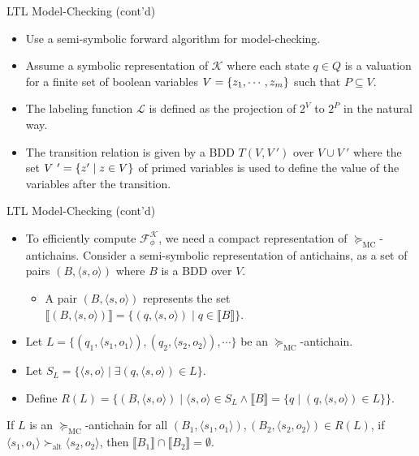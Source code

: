 \documentclass[12pt]{beamer}
\begin{document}
\begin{frame}{LTL Model-Checking (cont'd)}
	\begin{itemize}
		\item Use a semi-symbolic forward algorithm for model-checking.
		\item Assume
		a symbolic representation of $\mathcal{K}$ where each state $q \in Q$ is a valuation for a finite set
		of boolean variables $V = \{\mathnormal{z}_{1}, \cdots , \mathnormal{z}_{\mathnormal{m}}\}$ such that $P \subseteq V$.
		\item The labeling function $\mathcal{L}$ is defined as the projection of $2^{V}$ to $2^{P}$ in the natural way.
		\item The transition relation is given
		by a BDD $T(V, V~')$ over $V \cup V~'$ where the set $V~' = \{\mathnormal{z}' \mid \mathnormal{z} \in V\}$ of primed variables
		is used to define the value of the variables after the transition.
	\end{itemize}
\end{frame}

\begin{frame}{LTL Model-Checking (cont'd)}
	\begin{itemize}
		\item To efficiently compute $\mathcal{F}_{\phi}^{\mathcal{K}}$, we need a compact representation of $\succeq_{\text{MC}}$-antichains. Consider a semi-symbolic representation of antichains, as a set of pairs $(B, \langle s, o \rangle)$ where $B$ is a BDD over $V$.
		\begin{itemize}
			\item A pair $(B, \langle s, o \rangle)$ represents the set $\llbracket (B, \langle s, o \rangle) \rrbracket = \{(q, \langle s, o \rangle) \mid q \in \llbracket B \rrbracket\}$.
		\end{itemize}
		\item Let $L = \{(q_{1}, \langle s_{1},  o_{1} \rangle), (q_{2}, \langle s_{2}, o_{2} \rangle), \cdots \}$ be an $\succeq_{\text{MC}}$-antichain.
		\item Let $S_{L} = \{\langle s, o \rangle \mid \exists (q, \langle s, o \rangle) \in L\}$.
		\item Define $R(L) = \{(B, \langle s, o \rangle) \mid \langle s, o \rangle \in S_{L} \land \llbracket B \rrbracket = \{q \mid (q, \langle s, o \rangle) \in L \} \}$.
	\end{itemize}
	\begin{lemma}
		If $L$ is an $\succeq_{\text{MC}}$-antichain for all $(B_{1}, \langle s_{1}, o_{1} \rangle), (B_{2}, \langle s_{2}, o_{2} \rangle) \in R(L)$, if $\langle s_{1}, o_{1} \rangle \succ_{\text{alt}} \langle s_{2}, o_{2} \rangle$, then $\llbracket B_{1} \rrbracket \cap \llbracket B_{2} \rrbracket = \emptyset$.
	\end{lemma}
\end{frame}
\end{document}
